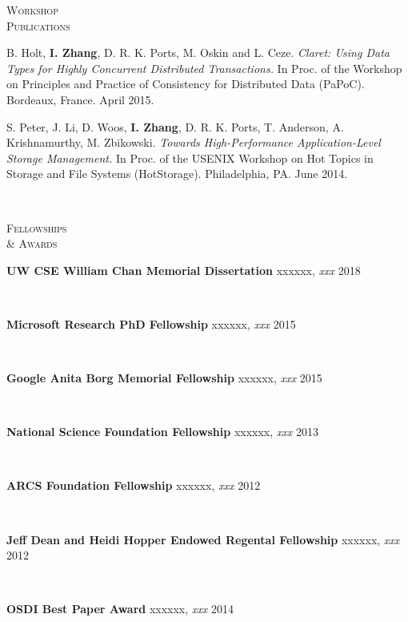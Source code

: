 \documentclass[10pt,times]{report}
\newlength{\sectiongap}
\newlength{\entrygap}
\newlength{\sectioncolwidth}
\newlength{\colgap}
\newlength{\stuffwidth}
\def\ifEqString#1#2{\def\testa{#1}\def\testb{#2}%
  \ifx\testa\testb}
\newenvironment{rtable}{
  \begin{minipage}{\textwidth}
  }{
  \end{minipage}
}
\newenvironment{rentry}[3][xxx]{
  \begin{minipage}[t]{\hsize}
    \textbf{#2}\ifEqString{#1}{xxx}\relax\else, \textit{#1}\fi
    \hspace{\stretch{1}} #3 \\
  }{
    \removelastskip
  \end{minipage}
  \\[\entrygap]  %
}
\newenvironment{rsection}[1]{
  \begin{minipage}[t]{\sectioncolwidth}
    \textsc{#1}
  \end{minipage}
  \hspace{\colgap}
  \begin{minipage}[t]{\stuffwidth}
  }{
    \removelastskip
  \end{minipage}
  \\[\sectiongap]
}
\begin{document}
\begin{rtable}
\begin{rsection}{Workshop\\Publications}
    B. Holt, \textbf{I. Zhang}, D. R. K. Ports, M. Oskin and L. Ceze.
    \textit{Claret: Using Data Types for Highly Concurrent Distributed
      Transactions.} In Proc. of the Workshop on Principles and
    Practice of Consistency for Distributed Data (PaPoC).  Bordeaux,
    France. April 2015.\\\vspace{-0.5em}

    S. Peter, J. Li, D. Woos, \textbf{I. Zhang}, D. R. K. Ports,
    T. Anderson, A. Krishnamurthy, M. Zbikowski. \textit{Towards
      High-Performance Application-Level Storage Management.} In
    Proc. of the USENIX Workshop on Hot Topics in Storage and
    File Systems (HotStorage). Philadelphia, PA. June
    2014.
  \end{rsection}

  \begin{rsection}{Fellowships\\\& Awards}
    \begin{rentry}{UW CSE William Chan Memorial Dissertation}{2018}
      \vspace{-0.75em}
    \end{rentry} 
    \begin{rentry}{Microsoft Research PhD Fellowship}{2015}
      \vspace{-0.75em}
    \end{rentry} 
    \begin{rentry}{Google Anita Borg Memorial Fellowship}{2015}
      \vspace{-0.75em}
    \end{rentry} 
    \begin{rentry}{National Science Foundation Fellowship}{2013}
      \vspace{-0.75em}
    \end{rentry}
    \begin{rentry}{ARCS Foundation Fellowship}{2012}
       \vspace{-0.75em}
    \end{rentry}
    \begin{rentry}{Jeff Dean and Heidi Hopper Endowed Regental Fellowship}{2012}
       \vspace{-0.75em}
    \end{rentry}
    \begin{rentry}{OSDI Best Paper Award}{2014}
      \vspace{-0.75em}
    \end{rentry}

\end{rsection}
\end{rtable}
\end{document}

